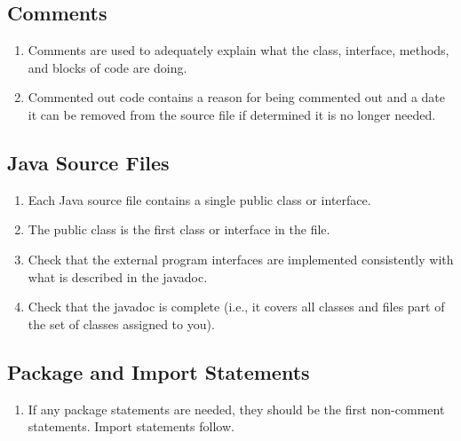 \subsection*{Comments}\begin{enumerate}[resume, label=C\arabic*., ref=C\arabic*]
\item \checklistref Comments are used to adequately explain what the class, interface, methods, and blocks of code are doing.
\item \checklistref Commented out code contains a reason for being commented out and a date it can be removed from the source file if determined it is no longer needed.
\end{enumerate}

\subsection*{Java Source Files}\begin{enumerate}[resume, label=C\arabic*., ref=C\arabic*]
\item \checklistref Each Java source file contains a single public class or interface.
\item \checklistref The public class is the first class or interface in the file.
\item \checklistref Check that the external program interfaces are implemented consistently with what is described in the javadoc.
\item \checklistref Check that the javadoc is complete (i.e., it covers all classes and files part of the set of classes assigned to you).
\end{enumerate}

\subsection*{Package and Import Statements}\begin{enumerate}[resume, label=C\arabic*., ref=C\arabic*]
\item \checklistref If any package statements are needed, they should be the first non-comment statements. Import statements follow.
\end{enumerate}

